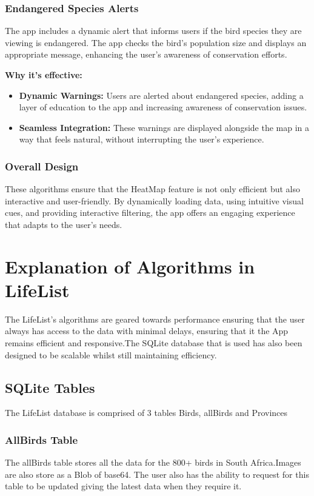 \documentclass{article}
\begin{document}
\subsubsection{Endangered Species Alerts}
The app includes a dynamic alert that informs users if the bird species they are viewing is endangered. The app checks the bird's population size and displays an appropriate message, enhancing the user's awareness of conservation efforts.

\textbf{Why it's effective:}
\begin{itemize}
    \item \textbf{Dynamic Warnings:} Users are alerted about endangered species, adding a layer of education to the app and increasing awareness of conservation issues.
    \item \textbf{Seamless Integration:} These warnings are displayed alongside the map in a way that feels natural, without interrupting the user's experience.
\end{itemize}

\subsubsection{Overall Design}
These algorithms ensure that the HeatMap feature is not only efficient but also interactive and user-friendly. By dynamically loading data, using intuitive visual cues, and providing interactive filtering, the app offers an engaging experience that adapts to the user's needs.

\section{Explanation of Algorithms in LifeList}
The LifeList's algorithms are geared towards performance ensuring that the user always has access to the data with minimal delays, ensuring that it the App remains efficient and responsive.The SQLite database that is used has also been designed to be scalable whilst still maintaining efficiency. 

\subsection{SQLite Tables}
The LifeList database is comprised of 3 tables Birds, allBirds and Provinces

\subsubsection{AllBirds Table}
The allBirds table stores all the data for the 800+ birds in South Africa.Images are also store as a Blob of base64. The user also has the ability to request for this table to be updated giving the latest data when they require it.
\end{document}

